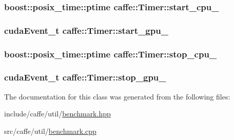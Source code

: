 \hypertarget{classcaffe_1_1_timer_a3cbebb809a42eda35357bdc7363b9afc}{
\subsubsection[{start\+\_\+cpu\+\_\+}]{\setlength{\rightskip}{0pt plus 5cm}boost\+::posix\+\_\+time\+::ptime caffe\+::\+Timer\+::start\+\_\+cpu\+\_\+\hspace{0.3cm}{\ttfamily [protected]}}}\label{classcaffe_1_1_timer_a3cbebb809a42eda35357bdc7363b9afc}
\hypertarget{classcaffe_1_1_timer_aaeef1178d30cea3cebf7a4a0eac02e6f}{
\subsubsection[{start\+\_\+gpu\+\_\+}]{\setlength{\rightskip}{0pt plus 5cm}cuda\+Event\+\_\+t caffe\+::\+Timer\+::start\+\_\+gpu\+\_\+\hspace{0.3cm}{\ttfamily [protected]}}}\label{classcaffe_1_1_timer_aaeef1178d30cea3cebf7a4a0eac02e6f}
\hypertarget{classcaffe_1_1_timer_acca9361263d52a7e28d291933220e2f5}{
\subsubsection[{stop\+\_\+cpu\+\_\+}]{\setlength{\rightskip}{0pt plus 5cm}boost\+::posix\+\_\+time\+::ptime caffe\+::\+Timer\+::stop\+\_\+cpu\+\_\+\hspace{0.3cm}{\ttfamily [protected]}}}\label{classcaffe_1_1_timer_acca9361263d52a7e28d291933220e2f5}
\hypertarget{classcaffe_1_1_timer_a7802204485bd7825f8bd7fad90bbdfd7}{
\subsubsection[{stop\+\_\+gpu\+\_\+}]{\setlength{\rightskip}{0pt plus 5cm}cuda\+Event\+\_\+t caffe\+::\+Timer\+::stop\+\_\+gpu\+\_\+\hspace{0.3cm}{\ttfamily [protected]}}}\label{classcaffe_1_1_timer_a7802204485bd7825f8bd7fad90bbdfd7}


The documentation for this class was generated from the following files\+:\begin{DoxyCompactItemize}
\item 
include/caffe/util/\hyperlink{benchmark_8hpp}{benchmark.\+hpp}\item 
src/caffe/util/\hyperlink{benchmark_8cpp}{benchmark.\+cpp}\end{DoxyCompactItemize}
